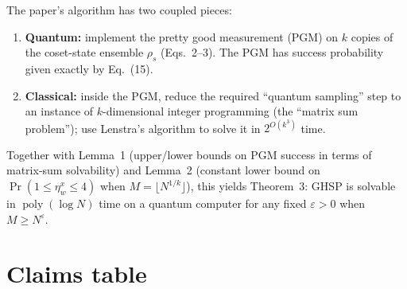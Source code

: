 \documentclass[11pt]{article}
\begin{document}
The paper's algorithm has two coupled pieces:
\begin{enumerate}\itemsep-2pt
  \item \textbf{Quantum:} implement the pretty good measurement (PGM)
        on $k$ copies of the coset-state ensemble $\rho_s$ (Eqs.~2--3).
        The PGM has success probability given exactly by Eq.~(15).
  \item \textbf{Classical:} inside the PGM, reduce the required
        ``quantum sampling'' step to an instance of $k$-dimensional
        integer programming (the ``matrix sum problem''); use
        Lenstra's algorithm to solve it in $2^{O(k^3)}$ time.
\end{enumerate}
Together with Lemma~1 (upper/lower bounds on PGM success in terms of
matrix-sum solvability) and Lemma~2 (constant lower bound on
$\Pr(1\le\eta_w^x\le 4)$ when $M=\lfloor N^{1/k}\rfloor$), this yields
Theorem~3: GHSP is solvable in $\operatorname{poly}(\log N)$ time on a
quantum computer for any fixed $\varepsilon>0$ when $M\ge N^\varepsilon$.

\section{Claims table}
\end{document}
